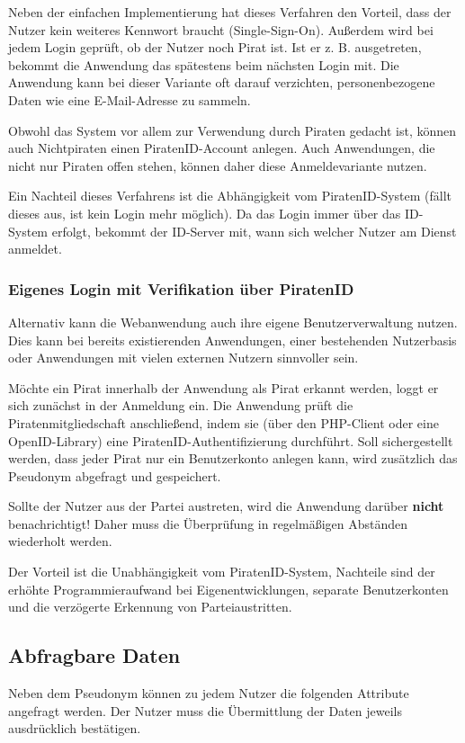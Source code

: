 Neben der einfachen Implementierung hat dieses Verfahren den Vorteil, dass der Nutzer kein weiteres Kennwort braucht (Single-Sign-On).
Außerdem wird bei jedem Login geprüft, ob der Nutzer noch Pirat ist. Ist er z. B. ausgetreten, bekommt die Anwendung das spätestens beim nächsten Login mit.
Die Anwendung kann bei dieser Variante oft darauf verzichten, personenbezogene Daten wie eine E-Mail-Adresse zu sammeln.

Obwohl das System vor allem zur Verwendung durch Piraten gedacht ist, können auch Nichtpiraten einen PiratenID-Account anlegen.
Auch Anwendungen, die nicht nur Piraten offen stehen, können daher diese Anmeldevariante nutzen.

Ein Nachteil dieses Verfahrens ist die Abhängigkeit vom PiratenID-System (fällt dieses aus, ist kein Login mehr möglich).
Da das Login immer über das ID-System erfolgt, bekommt der ID-Server mit, wann sich welcher Nutzer am Dienst anmeldet.


\subsubsection{Eigenes Login mit Verifikation über PiratenID}
Alternativ kann die Webanwendung auch ihre eigene Benutzerverwaltung nutzen.
Dies kann bei bereits existierenden Anwendungen, einer bestehenden Nutzerbasis oder Anwendungen mit vielen externen Nutzern sinnvoller sein.

Möchte ein Pirat innerhalb der Anwendung als Pirat erkannt werden, loggt er sich zunächst in der Anmeldung ein.
Die Anwendung prüft die Piratenmitgliedschaft anschließend, indem sie (über den PHP-Client oder eine OpenID-Library) eine PiratenID-Authentifizierung durchführt.
Soll sichergestellt werden, dass jeder Pirat nur ein Benutzerkonto anlegen kann, wird zusätzlich das Pseudonym abgefragt und gespeichert.

Sollte der Nutzer aus der Partei austreten, wird die Anwendung darüber \textbf{nicht} benachrichtigt!
Daher muss die Überprüfung in regelmäßigen Abständen wiederholt werden.

Der Vorteil ist die Unabhängigkeit vom PiratenID-System, Nachteile sind der erhöhte Programmieraufwand bei Eigenentwicklungen,
separate Benutzerkonten und die verzögerte Erkennung von Parteiaustritten.

\subsection{Abfragbare Daten}
\label{sec:attribute}
Neben dem Pseudonym können zu jedem Nutzer die folgenden Attribute angefragt werden.
Der Nutzer muss die Übermittlung der Daten jeweils ausdrücklich bestätigen.


